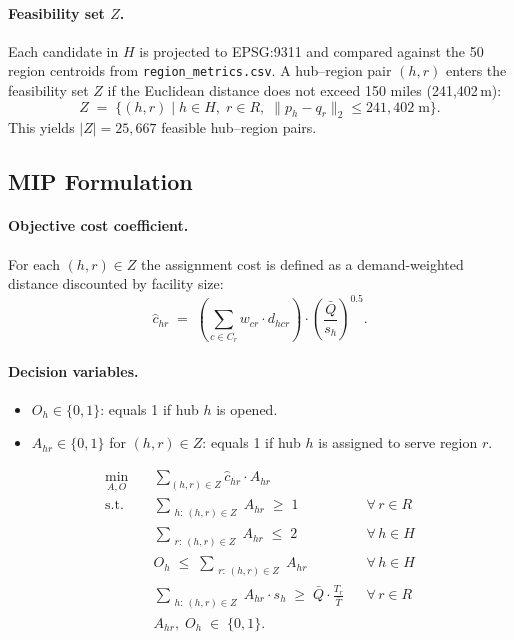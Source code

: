 \paragraph{Feasibility set $Z$.}
Each candidate in $H$ is projected to EPSG:9311 and compared against the 50 region centroids from \texttt{region\_metrics.csv}. A hub--region pair $(h, r)$ enters the feasibility set $Z$ if the Euclidean distance does not exceed 150 miles (241{,}402\,m):
\begin{equation}
    Z \;=\; \bigl\{(h, r) \mid h \in H,\; r \in R,\; \|p_h - q_r\|_2 \leq 241{,}402\;\text{m}\bigr\}.
\end{equation}
This yields $|Z| = 25{,}667$ feasible hub--region pairs.

\subsection{MIP Formulation}

\paragraph{Objective cost coefficient.}
For each $(h, r) \in Z$ the assignment cost is defined as a demand-weighted distance discounted by facility size:
\begin{equation}
    \hat{c}_{hr} \;=\; \left(\sum_{c \in C_r} w_{cr} \cdot d_{hcr}\right) \cdot \left(\frac{\bar{Q}}{s_h}\right)^{0.5}.
\end{equation}

\paragraph{Decision variables.}
\begin{itemize}
    \item $O_h \in \{0,1\}$: equals 1 if hub $h$ is opened.
    \item $A_{hr} \in \{0,1\}$ for $(h,r) \in Z$: equals 1 if hub $h$ is assigned to serve region $r$.
\end{itemize}

\begin{align}
    \min_{A, O} \quad & \sum_{(h,r)\in Z} \hat{c}_{hr} \cdot A_{hr} \\[4pt]
    \text{s.t.} \quad
    & \sum_{\substack{h:\,(h,r)\in Z}} A_{hr} \;\geq\; 1
        && \forall\, r \in R \\[2pt]
    & \sum_{\substack{r:\,(h,r)\in Z}} A_{hr} \;\leq\; 2
        && \forall\, h \in H \\[2pt]
    & O_h \;\leq\; \sum_{\substack{r:\,(h,r)\in Z}} A_{hr}
        && \forall\, h \in H \\[2pt]
    & \sum_{\substack{h:\,(h,r)\in Z}} A_{hr} \cdot s_h \;\geq\; \bar{Q}\cdot\frac{T_r}{\bar{T}}
        && \forall\, r \in R \\[2pt]
    & A_{hr},\; O_h \;\in\; \{0,1\}.
\end{align}


